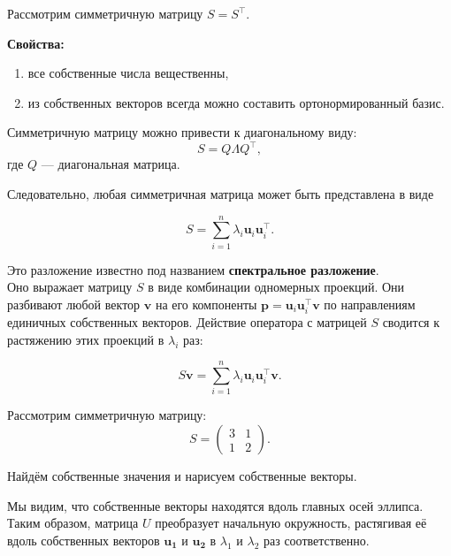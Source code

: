 \documentclass[11pt,a4paper]{article}
\providecommand{\tightlist}{%
      \setlength{\itemsep}{0pt}\setlength{\parskip}{0pt}}
\begin{document}
Рассмотрим симметричную матрицу \(S = S^\top\).

\textbf{Свойства:}

\begin{enumerate}
\def\labelenumi{\arabic{enumi}.}
\tightlist
\item
  все собственные числа вещественны,
\item
  из собственных векторов всегда можно составить ортонормированный базис.
\end{enumerate}

Симметричную матрицу можно привести к диагональному виду:
\[ S = Q \Lambda Q^\top, \] где \(Q\) --- диагональная матрица.

Следовательно, любая симметричная матрица может быть представлена в виде

\[ S = \sum\limits_{i=1}^n \lambda_i \mathbf{u}_i \mathbf{u}_i^\top. \]

Это разложение известно под названием \textbf{спектральное
разложение}.\\
Оно выражает матрицу \(S\) в виде комбинации одномерных проекций. Они
разбивают любой вектор \(\mathbf{v}\) на его компоненты
\(\mathbf{p} = \mathbf{u}_i \mathbf{u}_i^\top \mathbf{v}\) по
направлениям единичных собственных векторов.
Действие оператора с матрицей \(S\) сводится к растяжению этих проекций в \(\lambda_i\) раз:

\[ S\mathbf{v} = \sum\limits_{i=1}^n \lambda_i \mathbf{u}_i \mathbf{u}_i^\top \mathbf{v}. \]

    Рассмотрим симметричную матрицу: \[
  S = 
  \begin{pmatrix}
    3 & 1 \\
    1 & 2
  \end{pmatrix}.
\]

Найдём собственные значения и нарисуем собственные векторы.

Мы видим, что собственные векторы находятся вдоль главных осей эллипса.
Таким образом, матрица \(U\) преобразует начальную окружность,
растягивая её вдоль собственных векторов \(\mathbf{u_1}\) и
\(\mathbf{u_2}\) в \(\lambda_1\) и \(\lambda_2\) раз соответственно.
\end{document}
